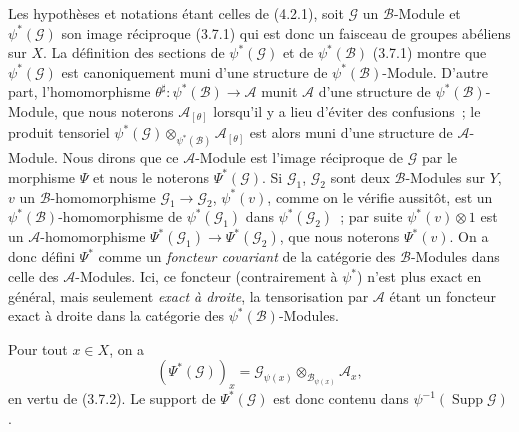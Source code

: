 \begin{env}[4.3.1]
\label{0.4.3.1-fr}
Les hypothèses et notations étant celles de (4.2.1), soit $\mathcal{G}$ un
$\mathcal{B}$-Module et $\psi^*(\mathcal{G})$ son image réciproque (3.7.1)
qui est donc un faisceau de groupes abéliens sur $X$. La définition des
sections de $\psi^*(\mathcal{G})$ et de $\psi^*(\mathcal{B})$ (3.7.1)
montre que $\psi^*(\mathcal{G})$ est canoniquement muni d'une structure de
$\psi^*(\mathcal{B})$-Module. D'autre part, l'homomorphisme
$\theta^\sharp:\psi^*(\mathcal{B})\to\mathcal{A}$ munit $\mathcal{A}$ d'une
structure de $\psi^*(\mathcal{B})$-Module, que nous noterons
$\mathcal{A}_{[\theta]}$ lorsqu'il y a lieu d'éviter des confusions~; le
produit tensoriel
$\psi^*(\mathcal{G})\otimes_{\psi^*(\mathcal{B})}\mathcal{A}_{[\theta]}$
est alors muni d'une structure de $\mathcal{A}$-Module. Nous dirons que ce
$\mathcal{A}$-Module est l'image réciproque de $\mathcal{G}$ par le morphisme
$\Psi$ et nous le noterons $\Psi^*(\mathcal{G})$. Si $\mathcal{G}_1$,
$\mathcal{G}_2$ sont deux $\mathcal{B}$-Modules sur $Y$, $v$ un
$\mathcal{B}$-homomorphisme $\mathcal{G}_1\to\mathcal{G}_2$,
$\psi^*(v)$, comme on le vérifie aussitôt, est un
$\psi^*(\mathcal{B})$-homomorphisme de $\psi^*(\mathcal{G}_1)$ dans
$\psi^*(\mathcal{G}_2)$~; par suite $\psi^*(v)\otimes1$ est un
$\mathcal{A}$-homomorphisme $\Psi^*(\mathcal{G}_1)\to\Psi^*(\mathcal{G}_2)$,
que nous noterons $\Psi^*(v)$. On a donc défini $\Psi^*$ comme un
\emph{foncteur covariant} de la catégorie des $\mathcal{B}$-Modules dans celle
des $\mathcal{A}$-Modules. Ici, ce foncteur (contrairement à $\psi^*$) n'est
plus exact en général, mais seulement \emph{exact à droite}, la tensorisation
par $\mathcal{A}$ étant un foncteur exact à droite dans la catégorie des
$\psi^*(\mathcal{B})$-Modules.

Pour tout $x\in X$, on a
\[
  (\Psi^*(\mathcal{G}))_x
  =\mathcal{G}_{\psi(x)}\otimes_{\mathcal{B}_{\psi(x)}}\mathcal{A}_x,
\]
en vertu de (3.7.2). Le support de $\Psi^*(\mathcal{G})$ est donc contenu dans
$\psi^{-1}(\operatorname{Supp}\mathcal{G})$.
\end{env}

